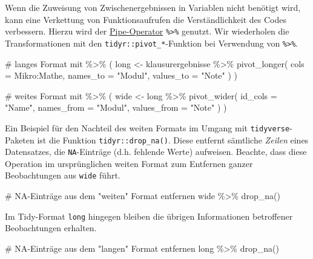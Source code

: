 \documentclass[
  a4paper,
  DIV=11,
  oneside]{scrreprt}
\newenvironment{Shaded}{\begin{snugshade}}{\end{snugshade}}
\newcommand{\NormalTok}[1]{\textcolor[rgb]{0.00,0.23,0.31}{#1}}
\begin{document}
Wenn die Zuweisung von Zwischenergebnissen in Variablen nicht benötigt
wird, kann eine Verkettung von Funktionsaufrufen die Verständlichkeit
des Codes verbessern. Hierzu wird der
\href{https://magrittr.tidyverse.org/reference/pipe.html}{Pipe-Operator}
\texttt{\%\textgreater{}\%} genutzt. Wir wiederholen die
Transformationen mit den \texttt{tidyr::pivot\_*}-Funktion bei
Verwendung von \texttt{\%\textgreater{}\%}.

\begin{Shaded}
\begin{Highlighting}[]
\NormalTok{\# langes Format mit \%\textgreater{}\%}
\NormalTok{(}
\NormalTok{  long \textless{}{-} klausurergebnisse \%\textgreater{}\% }
\NormalTok{    pivot\_longer(}
\NormalTok{      cols = Mikro:Mathe, }
\NormalTok{      names\_to = "Modul", }
\NormalTok{      values\_to = "Note"}
\NormalTok{    )}
\NormalTok{)}

\NormalTok{\# weites Format mit \%\textgreater{}\%}
\NormalTok{(}
\NormalTok{  wide \textless{}{-} long \%\textgreater{}\% }
\NormalTok{    pivot\_wider(}
\NormalTok{      id\_cols = "Name",}
\NormalTok{      names\_from = "Modul", }
\NormalTok{      values\_from = "Note"}
\NormalTok{    )}
\NormalTok{)}
\end{Highlighting}
\end{Shaded}

Ein Beispiel für den Nachteil des weiten Formats im Umgang mit
\texttt{tidyverse}-Paketen ist die Funktion \texttt{tidyr::drop\_na()}.
Diese entfernt sämtliche \emph{Zeilen} eines Datensatzes, die
\texttt{NA}-Einträge (d.h. fehlende Werte) aufweisen. Beachte, dass
diese Operation im ursprünglichen weiten Format zum Entfernen ganzer
Beobachtungen aus \texttt{wide} führt.

\begin{Shaded}
\begin{Highlighting}[]
\NormalTok{\# NA{-}Einträge aus dem "weiten" Format entfernen}
\NormalTok{wide \%\textgreater{}\% }
\NormalTok{  drop\_na()}
\end{Highlighting}
\end{Shaded}

Im Tidy-Format \texttt{long} hingegen bleiben die übrigen Informationen
betroffener Beobachtungen erhalten.

\begin{Shaded}
\begin{Highlighting}[]
\NormalTok{\# NA{-}Einträge aus dem "langen" Format entfernen}
\NormalTok{long \%\textgreater{}\% }
\NormalTok{  drop\_na()}
\end{Highlighting}
\end{Shaded}
\end{document}
